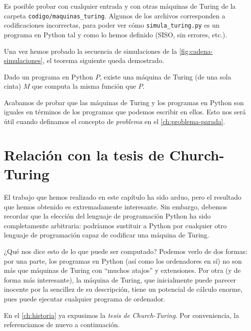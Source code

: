 Es posible probar con cualquier entrada y con otras máquinas de Turing de la carpeta \linebreak\texttt{codigo/maquinas\_turing}. Algunos de los archivos corresponden a codificaciones incorrectas, para poder ver cómo \texttt{simula\_turing.py} es un programa en Python tal y como lo hemos definido (SISO, sin errores, etc.).

Una vez hemos probado la secuencia de simulaciones de la \cref{fig:cadena-simulaciones}, el teorema siguiente queda demostrado.

\begin{teorema}\label{teo:equivalencia}
Dado un programa en Python $P$, existe una máquina de Turing (de una sola cinta) $M$ que computa la misma función que $P$.
\end{teorema}

Acabamos de probar que las máquinas de Turing y los programas en Python son iguales en términos de los programas que podemos escribir en ellos. Esto nos será útil cuando definamos el concepto de \emph{problema} en el \cref{ch:problema-parada}.

\section{Relación con la tesis de Church-Turing}\label{sec:church-turing}

El trabajo que hemos realizado en este capítulo ha sido arduo, pero el resultado que hemos obtenido es extremadamente interesante. Sin embargo, debemos recordar que la elección del lenguaje de programación Python ha sido completamente arbitraria: podríamos sustituir a Python por cualquier otro lenguaje de programación capaz de codificar una máquina de Turing.

¿Qué nos dice esto de lo que puede ser computado? Podemos verlo de dos formas: por una parte, los programas en Python (así como los ordenadores en sí) no son más que máquinas de Turing con ``muchos atajos'' y extensiones. Por otra (y de forma más interesante), la máquina de Turing, que inicialmente puede parecer inocente por la sencillez de su descripción, tiene un potencial de cálculo enorme, pues puede ejecutar cualquier programa de ordenador.

En el \cref{ch:historia} ya expusimos la \emph{tesis de Church-Turing}. Por conveniencia, la referenciamos de nuevo a continuación.

